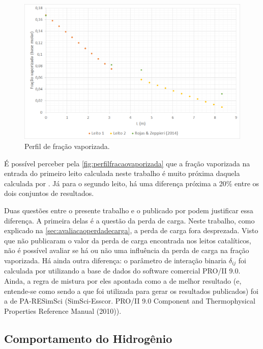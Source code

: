\begin{figure}[htb]
\centering \includegraphics[scale=0.4]{images/Chap4/perfilfracaovaporizada.png}
\caption{Perfil de fração vaporizada.}
\label{fig:perfilfracaovaporizada}
\end{figure}

É possível perceber pela \autoref{fig:perfilfracaovaporizada} que a fração
vaporizada na entrada do primeiro leito calculada neste trabalho é muito próxima
daquela calculada por . Já para o segundo leito, há uma
diferença próxima a 20\% entre os dois conjuntos de resultados.

Duas questões entre o presente trabalho e o publicado por
 podem justificar essa diferença. A primeira delas é a
questão da perda de carga. Neste trabalho, como explicado na
\autoref{sec:avaliacaoperdadecarga}, a perda de carga fora desprezada. Visto que
 não publicaram o valor da perda de carga encontrada nos
leitos catalíticos, não é possível avaliar se há ou não uma influência da perda
de carga na fração vaporizada. Há ainda outra diferença: o parâmetro de
interação binaria $\delta_{ij}$ foi calculada por 
utilizando a base de dados do software comercial PRO/II 9.0. Ainda, a regra de
mistura por eles apontada como a de melhor resultado (e, entende-se como sendo a
que foi utilizada para gerar os resultados publicados) foi a de PA-RESimSci
(SimSci-Esscor. PRO/II 9.0 Component and Thermophysical Properties Reference
Manual (2010)).

\subsection{Comportamento do Hidrogênio} \label{comportamentodohidrogenio}

